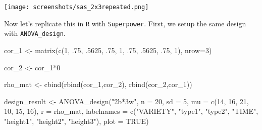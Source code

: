 \documentclass[
]{book}
\newenvironment{Shaded}{\begin{snugshade}}{\end{snugshade}}
\newcommand{\AttributeTok}[1]{\textcolor[rgb]{0.77,0.63,0.00}{#1}}
\newcommand{\ConstantTok}[1]{\textcolor[rgb]{0.00,0.00,0.00}{#1}}
\newcommand{\DecValTok}[1]{\textcolor[rgb]{0.00,0.00,0.81}{#1}}
\newcommand{\FunctionTok}[1]{\textcolor[rgb]{0.00,0.00,0.00}{#1}}
\newcommand{\NormalTok}[1]{#1}
\newcommand{\OtherTok}[1]{\textcolor[rgb]{0.56,0.35,0.01}{#1}}
\newcommand{\SpecialCharTok}[1]{\textcolor[rgb]{0.00,0.00,0.00}{#1}}
\newcommand{\StringTok}[1]{\textcolor[rgb]{0.31,0.60,0.02}{#1}}
\begin{document}
\texttt{[image: screenshots/sas\_2x3repeated.png]}

Now let's replicate this in \texttt{R} with \texttt{Superpower}. First, we setup the same design with \texttt{ANOVA\_design}.

\begin{Shaded}
\begin{Highlighting}[]
\NormalTok{cor\_1 }\OtherTok{\textless{}{-}} \FunctionTok{matrix}\NormalTok{(}\FunctionTok{c}\NormalTok{(}\DecValTok{1}\NormalTok{, .}\DecValTok{75}\NormalTok{, .}\DecValTok{5625}\NormalTok{,}
\NormalTok{                  .}\DecValTok{75}\NormalTok{, }\DecValTok{1}\NormalTok{, .}\DecValTok{75}\NormalTok{,}
\NormalTok{                  .}\DecValTok{5625}\NormalTok{, .}\DecValTok{75}\NormalTok{, }\DecValTok{1}\NormalTok{), }\AttributeTok{nrow=}\DecValTok{3}\NormalTok{)}

\NormalTok{cor\_2 }\OtherTok{\textless{}{-}}\NormalTok{ cor\_1}\SpecialCharTok{*}\DecValTok{0}

\NormalTok{rho\_mat }\OtherTok{\textless{}{-}} \FunctionTok{cbind}\NormalTok{(}\FunctionTok{rbind}\NormalTok{(cor\_1,cor\_2),}
                      \FunctionTok{rbind}\NormalTok{(cor\_2,cor\_1))}

\NormalTok{design\_result }\OtherTok{\textless{}{-}} \FunctionTok{ANOVA\_design}\NormalTok{(}\StringTok{"2b*3w"}\NormalTok{,}
                              \AttributeTok{n =} \DecValTok{20}\NormalTok{,}
                              \AttributeTok{sd =} \DecValTok{5}\NormalTok{,}
                              \AttributeTok{mu =} \FunctionTok{c}\NormalTok{(}\DecValTok{14}\NormalTok{, }\DecValTok{16}\NormalTok{, }\DecValTok{21}\NormalTok{,}
                                     \DecValTok{10}\NormalTok{, }\DecValTok{15}\NormalTok{, }\DecValTok{16}\NormalTok{),}
                              \AttributeTok{r =}\NormalTok{ rho\_mat,}
                              \AttributeTok{labelnames =} \FunctionTok{c}\NormalTok{(}\StringTok{"VARIETY"}\NormalTok{, }
                                             \StringTok{"type1"}\NormalTok{, }\StringTok{"type2"}\NormalTok{,}
                                             \StringTok{"TIME"}\NormalTok{, }
                                             \StringTok{"height1"}\NormalTok{, }\StringTok{"height2"}\NormalTok{, }
                                             \StringTok{"height3"}\NormalTok{),}
                              \AttributeTok{plot =} \ConstantTok{TRUE}\NormalTok{)}
\end{Highlighting}
\end{Shaded}
\end{document}
